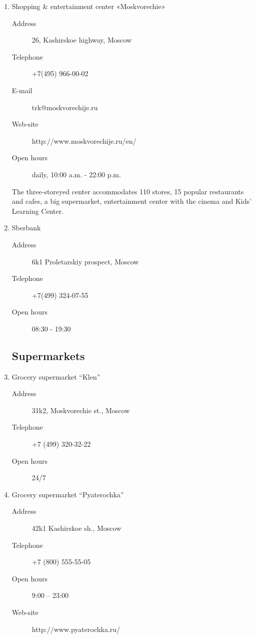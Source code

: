 \documentclass[10pt,fleqn,openany]{book} %
\begin{document}
\begin{enumerate}
	\item Shopping \& entertainment center «Moskvorechie»
	\begin{description}
		\item[Address] 26, Kashirskoe highway, Moscow
		\item[Telephone] +7(495) 966-00-02
		\item[E-mail] trk@moskvorechije.ru
		\item[Web-site] http://www.moskvorechije.ru/en/
		\item[Open hours] daily, 10:00 a.m. - 22:00 p.m.
	\end{description}
	
	The three-storeyed center accommodates 110 stores, 15 popular restaurants and cafes, a big supermarket, entertainment center with the cinema and Kids’ Learning Center.	
		
	\item Sberbank
	    \begin{description}
	    	\item[Address] 6k1 Proletarskiy prospect, Moscow
	    	\item[Telephone] +7(499) 324-07-55
	    	\item[Open hours] 08:30 - 19:30
	    \end{description}

    \subsection{Supermarkets}
    
	    \item Grocery supermarket “Klen”
	       	\begin{description}
	       		\item[Address] 31k2, Moskvorechie st., Moscow
	       		\item[Telephone] +7 (499) 320-32-22
	       		\item[Open hours] 24/7
	       	\end{description}
	
		\item Grocery supermarket “Pyaterochka”
	       	\begin{description}
	       		\item[Address] 42k1 Kashirskoe sh., Moscow
	       		\item[Telephone] +7 (800) 555-55-05
	       		\item[Open hours] 9:00 – 23:00
	       		\item[Web-site] http://www.pyaterochka.ru/  
	       	\end{description}
	      

\end{enumerate}
\end{document}
